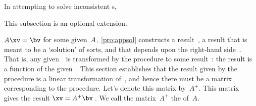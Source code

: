 
\begin{comment}
Could save 10 pages or so if omitted??
\end{comment}

In attempting to solve inconsistent s, 
\begin{aside}
This subsection is an optional extension.
\end{aside}%
\(A\xv=\bv\) for some given~\(A\)\,, \cref{pro:appsol} constructs a result~\xv, a result that is meant to be a `solution' of sorts, and that depends upon the right-hand side~\bv.
That is, any given~\bv\ is transformed by the procedure to some result~\xv: the result is a function of the given~\bv.
This section establishes that the result given by the procedure is a linear transformation of~\bv, and hence there must be a matrix corresponding to the procedure. 
Let's denote this matrix by~\(A^+\).
This matrix gives the result \(\xv=A^+\bv\)\,.
We call the matrix~\(A^+\) the  of~\(A\).

